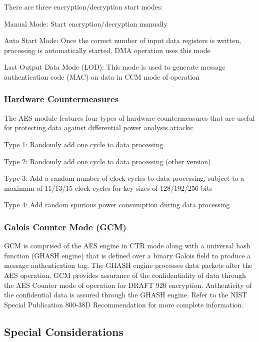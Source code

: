 There are three encryption/decryption start modes\+:
\begin{DoxyItemize}
\item Manual Mode\+: Start encryption/decryption manually
\item Auto Start Mode\+: Once the correct number of input data registers is written, processing is automatically started, D\+M\+A operation uses this mode
\item Last Output Data Mode (L\+O\+D)\+: This mode is used to generate message authentication code (M\+A\+C) on data in C\+C\+M mode of operation
\end{DoxyItemize}\hypertarget{group__asfdoc__sam0__drivers__aes__group_asfdoc_sam0_drivers_aes_module_overview_hardware_countermeasures}{}\subsubsection{Hardware Countermeasures}\label{group__asfdoc__sam0__drivers__aes__group_asfdoc_sam0_drivers_aes_module_overview_hardware_countermeasures}
The A\+E\+S module features four types of hardware countermeasures that are useful for protecting data against differential power analysis attacks\+:
\begin{DoxyItemize}
\item Type 1\+: Randomly add one cycle to data processing
\item Type 2\+: Randomly add one cycle to data processing (other version)
\item Type 3\+: Add a random number of clock cycles to data processing, subject to a maximum of 11/13/15 clock cycles for key sizes of 128/192/256 bits
\item Type 4\+: Add random spurious power consumption during data processing
\end{DoxyItemize}\hypertarget{group__asfdoc__sam0__drivers__aes__group_asfdoc_sam0_drivers_aes_module_overview_gcm}{}\subsubsection{Galois Counter Mode (\+G\+C\+M)}\label{group__asfdoc__sam0__drivers__aes__group_asfdoc_sam0_drivers_aes_module_overview_gcm}
G\+C\+M is comprised of the A\+E\+S engine in C\+T\+R mode along with a universal hash function (G\+H\+A\+S\+H engine) that is defined over a binary Galois field to produce a message authentication tag. The G\+H\+A\+S\+H engine processes data packets after the A\+E\+S operation. G\+C\+M provides assurance of the confidentiality of data through the A\+E\+S Counter mode of operation for D\+R\+A\+F\+T 920 encryption. Authenticity of the confidential data is assured through the G\+H\+A\+S\+H engine. Refer to the N\+I\+S\+T Special Publication 800-\/38\+D Recommendation for more complete information.\hypertarget{group__asfdoc__sam0__drivers__aes__group_asfdoc_sam0_drivers_aes_special_considerations}{}\subsection{Special Considerations}\label{group__asfdoc__sam0__drivers__aes__group_asfdoc_sam0_drivers_aes_special_considerations}
